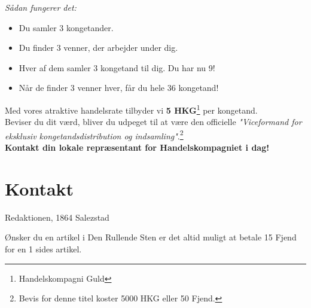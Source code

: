 \documentclass[letterpaper,12pt]{memoir}
\newcommand{\separator}{%
  \par\noindent{\color{black!40}\rule{\textwidth}{0.4pt}}\par
}
\begin{document}
\textit{Sådan fungerer det:}
\begin{itemize}
  \item Du samler 3 kongetander.
  \item Du finder 3 venner, der arbejder under dig.
  \item Hver af dem samler 3 kongetand til dig. Du har nu 9!
  \item Når de finder 3 venner hver, får du hele 36 kongetand!
\end{itemize}

Med vores atraktive handelsrate tilbyder vi \textbf{5 HKG}\footnote{Handelskompagni Guld} per kongetand. \\[0.5em]

Beviser du dit værd, bliver du udpeget til at være den officielle \textit{"Viceformand for eksklusiv kongetandsdistribution og indsamling"}.\footnote{Bevis for denne titel koster 5000 HKG eller 50 Fjend.} \\[1em]

\textbf{Kontakt din lokale repræsentant for Handelskompagniet i dag!}

\separator
\section*{Kontakt}
Redaktionen, 1864 Salezstad

Ønsker du en artikel i Den Rullende Sten er det altid muligt at betale 15 Fjend for en 1 sides artikel.
\end{document}
